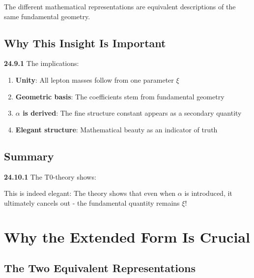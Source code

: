\documentclass[12pt,a4paper]{article}
\begin{document}
The different mathematical representations are equivalent descriptions of the same fundamental geometry.

\subsection{Why This Insight Is Important}

\noindent \textbf{24.9.1} The implications:
\begin{enumerate}
	\item \textbf{Unity}: All lepton masses follow from one parameter $\xi$
	\item \textbf{Geometric basis}: The coefficients stem from fundamental geometry
	\item \textbf{$\alpha$ is derived}: The fine structure constant appears as a secondary quantity
	\item \textbf{Elegant structure}: Mathematical beauty as an indicator of truth
\end{enumerate}

\subsection{Summary}

\noindent \textbf{24.10.1} The T0-theory shows:
\begin{center}
\end{center}

This is indeed elegant: The theory shows that even when $\alpha$ is introduced, it ultimately cancels out - the fundamental quantity remains $\xi$!


\section{Why the Extended Form Is Crucial}

\subsection{The Two Equivalent Representations}
\end{document}
